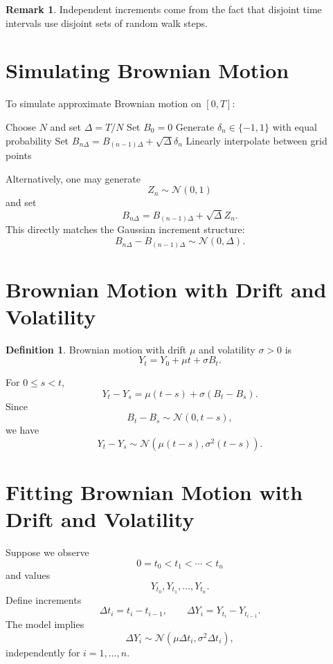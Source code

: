\documentclass[12pt,oneside]{book}
\numberwithin{equation}{section}
\theoremstyle{definition}
\newtheorem{definition}{Definition}[section]
\newtheorem{remark}{Remark}[section]
\theoremstyle{plain}
\theoremstyle{remark}
\newcommand{\Normal}{\mathcal{N}}
\begin{document}
\begin{remark}
Independent increments come from the fact that disjoint time intervals use disjoint sets of random walk steps.
\end{remark}

\section{Simulating Brownian Motion}

To simulate approximate Brownian motion on $[0,T]$:

\begin{algorithm}[H]
\caption{Approximate Brownian Motion}
\begin{algorithmic}[1]
\State Choose $N$ and set $\Delta=T/N$
\State Set $B_0=0$
    \State Generate $\delta_n\in\{-1,1\}$ with equal probability
    \State Set $B_{n\Delta}=B_{(n-1)\Delta}+\sqrt{\Delta}\delta_n$
\EndFor
\State Linearly interpolate between grid points
\end{algorithmic}
\end{algorithm}

Alternatively, one may generate
\[
Z_n\sim \Normal(0,1)
\]
and set
\[
B_{n\Delta}=B_{(n-1)\Delta}+\sqrt{\Delta}Z_n.
\]
This directly matches the Gaussian increment structure:
\[
B_{n\Delta}-B_{(n-1)\Delta}\sim \Normal(0,\Delta).
\]

\section{Brownian Motion with Drift and Volatility}

\begin{definition}
Brownian motion with drift $\mu$ and volatility $\sigma>0$ is
\[
Y_t=Y_0+\mu t+\sigma B_t.
\]
\end{definition}

For $0\le s<t$,
\[
Y_t-Y_s
=
\mu(t-s)+\sigma(B_t-B_s).
\]
Since
\[
B_t-B_s\sim \Normal(0,t-s),
\]
we have
\[
Y_t-Y_s\sim \Normal(\mu(t-s),\sigma^2(t-s)).
\]

\section{Fitting Brownian Motion with Drift and Volatility}

Suppose we observe
\[
0=t_0<t_1<\cdots<t_n
\]
and values
\[
Y_{t_0},Y_{t_1},\ldots,Y_{t_n}.
\]
Define increments
\[
\Delta t_i=t_i-t_{i-1},
\qquad
\Delta Y_i=Y_{t_i}-Y_{t_{i-1}}.
\]
The model implies
\[
\Delta Y_i\sim \Normal(\mu\Delta t_i,\sigma^2\Delta t_i),
\]
independently for $i=1,\ldots,n$.
\end{document}
